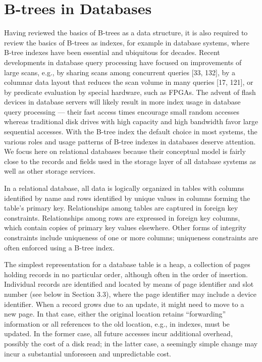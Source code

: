 \hypertarget{b-trees-in-databases}{%
\section{B-trees in Databases}\label{b-trees-in-databases}}

Having reviewed the basics of B-trees as a data structure, it is also
required to review the basics of B-trees as indexes, for example in
database systems, where B-tree indexes have been essential and
ubiquitous for decades. Recent developments in database query processing
have focused on improvements of large scans, e.g., by sharing scans
among concurrent queries {[}33, 132{]}, by a columnar data layout that
reduces the scan volume in many queries {[}17, 121{]}, or by predicate
evaluation by special hardware, such as FPGAs. The advent of flash
devices in database servers will likely result in more index usage in
database query processing --- their fast access times encourage small
random accesses whereas traditional disk drives with high capacity and
high bandwidth favor large sequential accesses. With the B-tree index
the default choice in most systems, the various roles and usage patterns
of B-tree indexes in databases deserve attention. We focus here on
relational databases because their conceptual model is fairly close to
the records and fields used in the storage layer of all database systems
as well as other storage services.

In a relational database, all data is logically organized in tables with
columns identified by name and rows identified by unique values in
columns forming the table's primary key. Relationships among tables are
captured in foreign key constraints. Relationships among rows are
expressed in foreign key columns, which contain copies of primary key
values elsewhere. Other forms of integrity constraints include
uniqueness of one or more columns; uniqueness constraints are often
enforced using a B-tree index.

The simplest representation for a database table is a heap, a collection
of pages holding records in no particular order, although often in the
order of insertion. Individual records are identified and located by
means of page identifier and slot number (see below in Section 3.3),
where the page identifier may include a device identifier. When a record
grows due to an update, it might need to move to a new page. In that
case, either the original location retains ``forwarding'' information or
all references to the old location, e.g., in indexes, must be updated.
In the former case, all future accesses incur additional overhead,
possibly the cost of a disk read; in the latter case, a seemingly simple
change may incur a substantial unforeseen and unpredictable cost.

